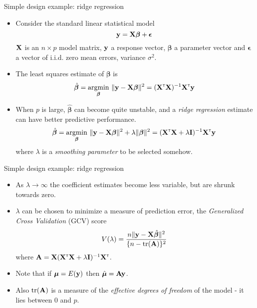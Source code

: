 \documentclass{beamer}
\newcommand{\bp}{{\bm \beta}}
\newcommand{\ts}{^{\mbox{\sf \tiny T}}}
\begin{document}
\begin{frame}{Simple design example: ridge regression}

\begin{itemize}
\item Consider the standard linear statistical model
$$
{\bf y} = {\bf X} \bp + {\bm \epsilon}
$$
$\bf X$ is an $n \times p$ model matrix, $\bf y$ a response vector, $\bp $ a parameter vector and ${\bm \epsilon}$ a vector of i.i.d. zero mean errors, variance $\sigma^2$.
\item The least squares estimate of $\bp$ is
$$
\hat \bp = \underset{\bp}{\text{argmin}}~ \|{\bf y} - {\bf X}\bp \|^2 = ({\bf X}\ts {\bf X})^{-1} {\bf X}\ts {\bf y}
$$
\item When $p$ is large, $\hat \bp$ can become quite unstable, and a {\em ridge regression} estimate can have better predictive performance.
$$
\hat \bp = \underset{\bp}{\text{argmin}}~ \|{\bf y} - {\bf X}\bp \|^2 + \lambda \|\bp\|^2 = ({\bf X}\ts {\bf X} + \lambda {\bf I})^{-1} {\bf X}\ts {\bf y}
$$
where $\lambda $ is a {\em smoothing parameter} to be selected somehow.
\end{itemize}
\end{frame}

\begin{frame}{Simple design example: ridge regression}
\begin{itemize}
\item As $\lambda \to \infty$ the coefficient estimates become less variable, but are shrunk towards zero.
\item $\lambda$ can be chosen to minimize a measure of prediction error, the {\em Generalized Cross Validation} (GCV) score
$$
V(\lambda) = \frac{n \|{\bf y} - {\bf X}\hat {\bm \beta}\|^2}{\{ n - \text{tr}({\bf A})\}^2}
$$
where ${\bf A} = {\bf X} ({\bf X}\ts {\bf X} + \lambda {\bf I})^{-1} {\bf X}\ts $.
\item Note that if ${\bm \mu} = E({\bf y})$ then $\hat {\bm \mu} = {\bf Ay}$.
\item Also $\text{tr}({\bf A})$ is a measure of the {\em effective degrees of freedom} of the model - it lies between 0 and $p$.
\end{itemize}
\end{frame}
\end{document}
